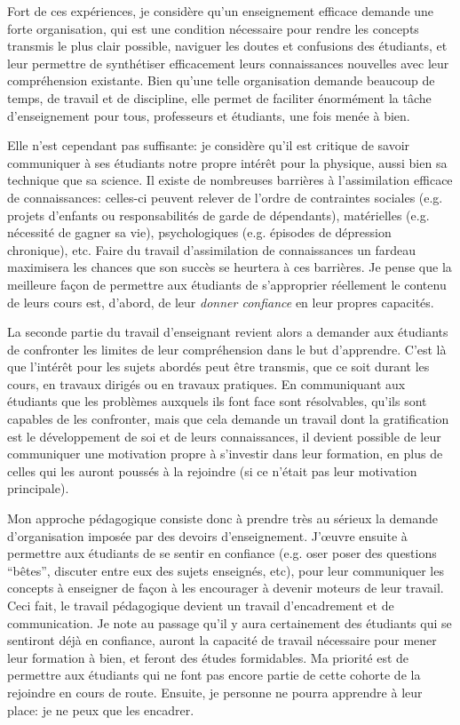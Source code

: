 \pg
Fort de ces exp\'eriences, je consid\`ere qu'un enseignement efficace demande une forte organisation, qui est une condition n\'ecessaire pour rendre les concepts transmis le plus clair possible, naviguer les doutes et confusions des \'etudiants, et leur permettre de synth\'etiser efficacement leurs connaissances nouvelles avec leur compr\'ehension existante. Bien qu'une telle organisation demande beaucoup de temps, de travail et de discipline, elle permet de faciliter \'enorm\'ement la t\^ache d'enseignement pour tous, professeurs et \'etudiants, une fois men\'ee \`a bien.

\pg
Elle n'est cependant pas suffisante: je consid\`ere qu'il est critique de savoir communiquer \`a ses \'etudiants notre propre int\'er\^et pour la physique, aussi bien sa technique que sa science. Il existe de nombreuses barri\`eres \`a l'assimilation efficace de connaissances: celles-ci peuvent relever de l'ordre de contraintes sociales (e.g. projets d'enfants ou responsabilit\'es de garde de d\'ependants), mat\'erielles (e.g. n\'ecessit\'e de gagner sa vie), psychologiques (e.g. \'episodes de d\'epression chronique), etc. Faire du travail d'assimilation de connaissances un fardeau maximisera les chances que son succ\`es se heurtera \`a ces barri\`eres. Je pense que la meilleure fa\c{c}on de permettre aux \'etudiants de s'approprier r\'eellement le contenu de leurs cours est, d'abord, de leur \textit{donner confiance} en leur propres capacit\'es. 

\pg
La seconde partie du travail d'enseignant revient alors a demander aux \'etudiants de confronter les limites de leur compr\'ehension dans le but d'apprendre. C'est l\`a que l'int\'er\^et pour les sujets abord\'es peut \^etre transmis, que ce soit durant les cours, en travaux dirig\'es ou en travaux pratiques. En communiquant aux \'etudiants que les probl\`emes auxquels ils font face sont r\'esolvables, qu'ils sont capables de les confronter, mais que cela demande un travail dont la gratification est le d\'eveloppement de soi et de leurs connaissances, il devient possible de leur communiquer une motivation propre \`a s'investir dans leur formation, en plus de celles qui les auront pouss\'es \`a la rejoindre (si ce n'\'etait pas leur motivation principale). 

\pg
Mon approche p\'edagogique consiste donc \`a prendre tr\`es au s\'erieux la demande d'organisation impos\'ee par des devoirs d'enseignement. J'{\oe}uvre ensuite \`a permettre aux \'etudiants de se sentir en confiance (e.g. oser poser des questions ``b\^etes'', discuter entre eux des sujets enseign\'es, etc), pour leur communiquer les concepts \`a enseigner de fa\c{c}on \`a les encourager \`a devenir moteurs de leur travail. Ceci fait, le travail p\'edagogique devient un travail d'encadrement et de communication. Je note au passage qu'il y aura certainement des \'etudiants qui se sentiront d\'ej\`a en confiance, auront la capacit\'e de travail n\'ecessaire pour mener leur formation \`a bien, et feront des \'etudes formidables. Ma priorit\'e est de permettre aux \'etudiants qui ne font pas encore partie de cette cohorte de la rejoindre en cours de route. Ensuite, je personne ne pourra apprendre \`a leur place: je ne peux que les encadrer.


